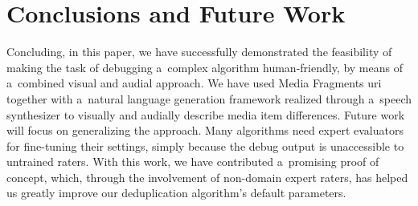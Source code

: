 \documentclass{article}
\begin{document}
\section{Conclusions and Future Work}
\label{sec:conclusions-and-future-work}

Concluding, in this paper, we have successfully demonstrated the feasibility
of making the task of debugging a~complex algorithm human-friendly,
by means of a~combined visual and audial approach.
We have used Media Fragments {\sc uri}
together with a~natural language generation framework
realized through a~speech synthesizer
to visually and audially describe media item differences.
Future work will focus on generalizing the approach.
Many algorithms need expert evaluators for fine-tuning their settings,
simply because the debug output is unaccessible to untrained raters.
With this work, we have contributed a~promising proof of concept,
which, through the involvement of non-domain expert raters,
has helped us greatly improve our deduplication algorithm's default parameters.

\begin{spacing}{0.934}


\end{spacing}
\end{document}
